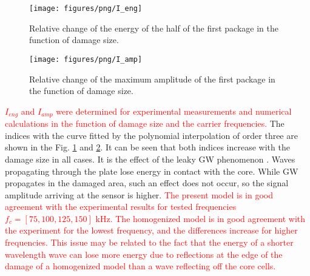 \documentclass[sensors,article,submit,moreauthors,pdftex]{Definitions/mdpi}
\begin{document}
\begin{figure}
	\begin{center}
		\texttt{[image: figures/png/I\_eng]}
	\end{center}
	\caption{Relative change of the energy of the half of the first package in the function of damage size.}
	\label{fig:madif_eng}
\end{figure}
\begin{figure}
	\begin{center}
		\texttt{[image: figures/png/I\_amp]}
	\end{center}
	\caption{Relative change of the maximum amplitude of the first package in the function of damage size.}
	\label{fig:madif_amp}
\end{figure}

\textcolor{red}{\(I_{eng}\) and \(I_{amp}\) were determined for experimental measurements and numerical calculations in the function of damage size and the carrier frequencies.}
The indices with the curve fitted by the polynomial interpolation of order three are shown in the Fig. \ref{fig:madif_eng} and \ref{fig:madif_amp}.
It can be seen that both indices increase with the damage size in all cases.
It is the effect of the leaky GW phenomenon \cite{song2009guided}.
Waves propagating through the plate lose energy in contact with the core.
While GW propagates in the damaged area, such an effect does not occur, so the signal amplitude arriving at the sensor is higher.
\textcolor{red}{The present model is in good agreement with the experimental results for tested frequencies \(f_c=[75, 100, 125, 150]\) kHz. 
The homogenized model is in good agreement with the experiment for the lowest frequency, and the differences increase for higher frequencies.
This issue may be related to the fact that the energy of a shorter wavelength wave can lose more energy due to reflections at the edge of the damage of a homogenized model than a wave reflecting off the core cells.}
\end{document}
